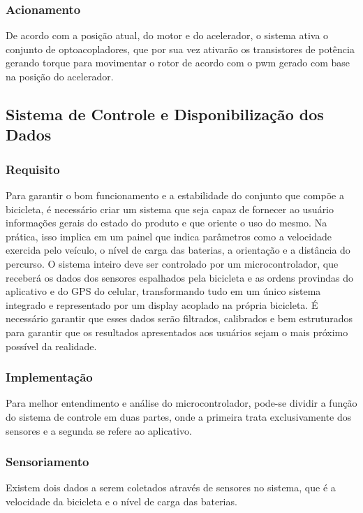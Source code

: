 	\subsubsection{Acionamento}
	De acordo com a posição atual, do motor e do acelerador, o sistema ativa o conjunto de optoacopladores, que por sua vez ativarão os transistores de potência gerando torque para movimentar o rotor de acordo com o pwm gerado com base na posição do acelerador.
  
 	 \subsection{Sistema de Controle e Disponibilização dos Dados}
 	\subsubsection{Requisito}
 		Para garantir o bom funcionamento e a estabilidade do conjunto que compõe a bicicleta, é necessário criar um sistema que seja capaz de fornecer ao usuário informações gerais do estado do produto e que oriente o uso do mesmo. Na prática, isso implica em um painel que indica parâmetros como a velocidade exercida pelo veículo, o nível de carga das baterias, a orientação e a distância do percurso.
O sistema inteiro deve ser controlado por um microcontrolador, que receberá os dados dos sensores espalhados pela bicicleta e as ordens provindas do aplicativo e do GPS do celular, transformando tudo em um único sistema integrado e representado por um display acoplado na própria bicicleta. É necessário garantir que esses dados serão filtrados, calibrados e bem estruturados para garantir que os resultados apresentados aos usuários sejam o mais próximo possível da realidade.
	
	\subsubsection{Implementação}
	Para melhor entendimento e análise do microcontrolador, pode-se dividir a função do sistema de controle em duas partes, onde a primeira trata exclusivamente dos sensores e a segunda se refere ao aplicativo.

	\subsubsection{Sensoriamento}
	Existem dois dados a serem coletados através de sensores no sistema, que é a velocidade da bicicleta e o nível de carga das baterias.

